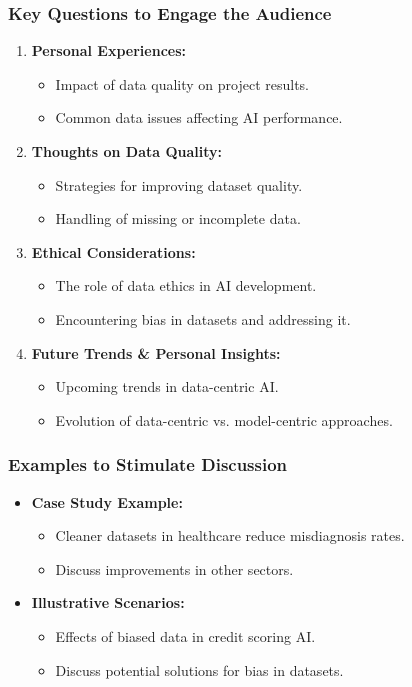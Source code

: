 \documentclass[aspectratio=169]{beamer}
\begin{document}
\begin{frame}[fragile]
    \frametitle{Key Questions to Engage the Audience}
    \begin{enumerate}
        \item \textbf{Personal Experiences:}
            \begin{itemize}
                \item Impact of data quality on project results.
                \item Common data issues affecting AI performance.
            \end{itemize}
        \item \textbf{Thoughts on Data Quality:}
            \begin{itemize}
                \item Strategies for improving dataset quality.
                \item Handling of missing or incomplete data.
            \end{itemize}
        \item \textbf{Ethical Considerations:}
            \begin{itemize}
                \item The role of data ethics in AI development.
                \item Encountering bias in datasets and addressing it.
            \end{itemize}
        \item \textbf{Future Trends \& Personal Insights:}
            \begin{itemize}
                \item Upcoming trends in data-centric AI.
                \item Evolution of data-centric vs. model-centric approaches.
            \end{itemize}
    \end{enumerate}
\end{frame}

\begin{frame}[fragile]
    \frametitle{Examples to Stimulate Discussion}
    \begin{itemize}
        \item \textbf{Case Study Example:}
            \begin{itemize}
                \item Cleaner datasets in healthcare reduce misdiagnosis rates.
                \item Discuss improvements in other sectors.
            \end{itemize}
        \item \textbf{Illustrative Scenarios:}
            \begin{itemize}
                \item Effects of biased data in credit scoring AI.
                \item Discuss potential solutions for bias in datasets.
            \end{itemize}
    \end{itemize}
\end{frame}
\end{document}
